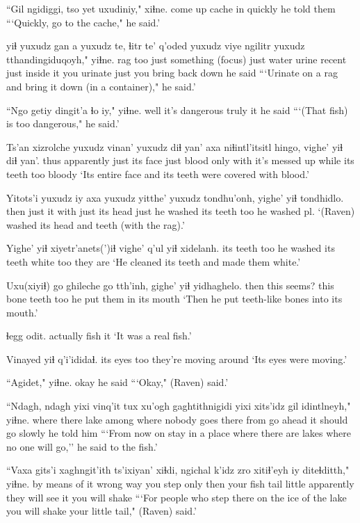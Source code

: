 \documentclass[12pt]{article}
\begin{document}
\gll ``Gil ngidiggi, tso yet uxudiniy," xiɬne.
come up cache in quickly {he told them}
\glt ```Quickly, go to the cache," he said.'
\glend

 yiɬ yuxudz gan a yuxudz te, {ɬitr te'} q'oded yuxudz viye ngilitr yuxudz tthandingiduqoyh," yiɬne.
rag too just something {(focus)} just water urine recent just {inside it} {you urinate} just {you bring back down} {he said}
\glt ```Urinate on a rag and bring it down (in a container)," he said.'
\glend

\gll ``Ngo {getiy dingit'a} ɬo iy," yiɬne.
well {it's dangerous} truly it {he said}
\glt ```(That fish) is too dangerous," he said.'
\glend

\gll Ts'an xizrolche yuxudz vinan' yuxudz diɬ yan' axa niɬintl'itsitl hingo, vighe' yiɬ {diɬ yan'.}
thus apparently just {its face} just blood only with {it's messed up} while {its teeth} too bloody
\glt `Its entire face and its teeth were covered with blood.'
\glend

\gll Yitots'i yuxudz iy axa yuxudz yitthe' yuxudz tondhu'onh, yighe' yiɬ tondhidlo.
then just it with just {its head} just {he washed} {its teeth} too {he washed pl.}
\glt `(Raven) washed its head and teeth (with the rag).'
\glend

\gll Yighe' yiɬ xiyetr'anets(')iɬ vighe' q'ul yiɬ xidelanh.
{its teeth} too {he washed} {its teeth} white too {they are}
\glt `He cleaned its teeth and made them white.'
\glend

\gll Uxu(xiyiɬ) go ghileche go tth'inh, gighe' yiɬ yidhaghelo.
then this {seems?} this bone teeth too {he put them in its mouth}
\glt `Then he put teeth-like bones into its mouth.'
\glend

 ɬegg odit.
actually fish it
\glt `It was a real fish.'
\glend

\gll Vinayed yiɬ q'i'ididaɬ.
{its eyes} too {they're moving around}
\glt `Its eyes were moving.'
\glend

\gll ``Agidet," yiɬne.
okay {he said}
\glt ```Okay," (Raven) said.'
\glend

\gll ``Ndagh, ndagh yixi vinq'it tux {xu'ogh gaghtithnigidi} yixi xits'idz gil idintlneyh," yiɬne.
where {} there lake among {where nobody goes} there from {go ahead} {it should go slowly} {he told him}
\glt ```From now on stay in a place where there are lakes where no one will go,'' he said to the fish.'
\glend

\gll ``Vaxa gits'i xaghngit'ith ts'ixiyan' xiɬdi, ngichal k'idz zro xitiɬ'eyh iy diteɬditth," yiɬne.
{by means of it} {wrong way} {you step} only then {your fish tail} little apparently {they will see} it {you will shake}
\glt ```For people who step there on the ice of the lake you will shake your little tail," (Raven) said.'
\glend
\end{document}
